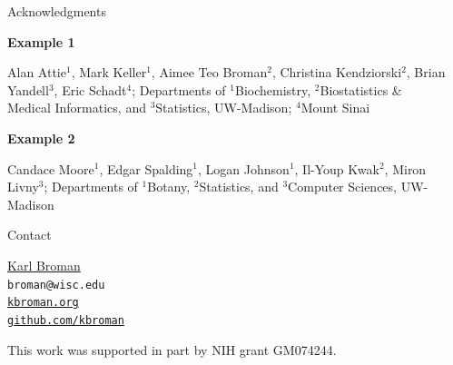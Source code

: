 \documentclass[final,plain]{beamer}
\newlength{\sepwid}
\newlength{\onecolwid}
\newcommand{\bluebold}{\color{dblue} \bf}
\newcommand{\coltwovsep}{\vspace{35.5mm}}
\begin{document}
\begin{frame}[t]
\begin{columns}[t]
\begin{column}{\onecolwid}
    \begin{block}{Acknowledgments}

      {\bluebold Example 1}

          \vspace{12pt}
          \hfill \begin{minipage}{0.165\paperwidth} Alan Attie$^1$,
            Mark Keller$^1$, Aimee Teo Broman$^2$, Christina
            Kendziorski$^2$, Brian Yandell$^3$, Eric Schadt$^4$;
            Departments of $^1$Biochemistry, $^2$Biostatistics \&
            Medical Informatics, and $^3$Statistics, UW-Madison;
            $^4$Mount Sinai
          \end{minipage}

          \vspace{24pt}

      {\bluebold Example 2}

          \vspace{12pt}
          \hfill \begin{minipage}{0.165\paperwidth}
            Candace Moore$^1$, Edgar Spalding$^1$, Logan Johnson$^1$, Il-Youp Kwak$^2$,
            Miron Livny$^3$; Departments of $^1$Botany,
            $^2$Statistics, and $^3$Computer Sciences, UW-Madison
          \end{minipage}

    \end{block}

  \coltwovsep %

    \begin{block}{Contact}
      \hspace{5em}
        \begin{minipage}{22em}
        \href{https://kbroman.org}{Karl Broman}\\
        {\tt broman@wisc.edu}\\
        \href{https://kbroman.org}{\tt kbroman.org} \\
        \href{https://github.com/kbroman}{\tt github.com/kbroman}
        \end{minipage}

    \vspace{60pt}
    {\rmfamily \footnotesize
    \centerline{This work was supported in part by NIH grant GM074244.}}
    \end{block}

  \end{column}

\begin{column}{\sepwid} \end{column}                 %


\end{columns}
\end{frame}
\end{document}

